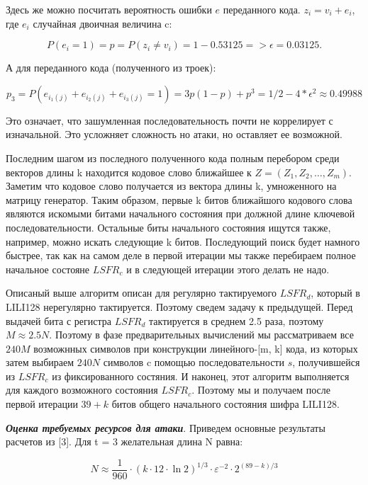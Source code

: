 \documentclass[colorthm]{./civarticle}
\begin{document}
Здесь же можно посчитать вероятность ошибки $e$ переданного кода. $z_i = v_i + e_i$, где $e_i$ случайная двоичная величина c: 

\begin{equation}
    P(e_i = 1) = p = P(z_i \neq v_i) = 1 - 0.53125 => \epsilon = 0.03125.
\end{equation}

А для переданного кода (полученного из троек): 

\begin{equation}
    p_3 = P(e_{i_1(j)} + e_{i_2(j)} + e_{i_3(j)} = 1) = 3p(1-p)+p^3 = 1/2 - 4*\epsilon^2 \approx 0.49988
\end{equation}

Это означает, что зашумленная последовательность почти не коррелирует с изначальной. Это усложняет сложность но атаки, но оставляет ее возможной.

Последним шагом из последного полученного кода полным перебором среди векторов длины k находится кодовое слово ближайшее к $Z = (Z_1, Z_2, \dots, Z_m)$. Заметим что кодовое слово получается из вектора длины k, умноженного на матрицу генератор. Таким образом, первые k битов ближайшого кодового слова являются искомыми битами начального состояния при должной длине ключевой последовательности. Остальные биты начального состояния ищутся также, например, можно искать следующие k битов. Последующий поиск будет намного быстрее, так как на самом деле в первой итерации мы также перебираем полное начальное состояне $LSFR_c$ и в следующей итерации этого делать не надо. 

Описаный выше алгоритм описан для регулярно тактируемого $LSFR_d$, который в LILI128 нерегулярно тактируется. Поэтому сведем задачу к предыдущей. Перед выдачей бита с регистра $LSFR_d$ тактируется в среднем 2.5 раза, поэтому $M \approx 2.5N$. Поэтому в фазе предварительных вычислений мы рассматриваем все $240M$ возможнных символов при конструкции линейного-[m, k] кода, из которых затем выбираем $240N$ символов c помощью последовательности $s$, получившейся из $LSFR_c$ из фиксированного состяния. И наконец, этот алгоритм выполняется для каждого возможного состояния $LSFR_c$. Поэтому мы и получаем после первой итерации $39 + k$ битов общего начального состояния шифра LILI128.

\textbf{\emph{Оценка требуемых ресурсов для атаки}}. Приведем основные результаты расчетов из [3]. Для t = 3 желательная длина N равна: 

\begin{equation}
    N \approx \frac{1}{960} \cdot(k \cdot 12 \cdot \ln 2)^{1 / 3} \cdot \varepsilon^{-2} \cdot 2^{(89-k) / 3}
\end{equation}
\end{document}
